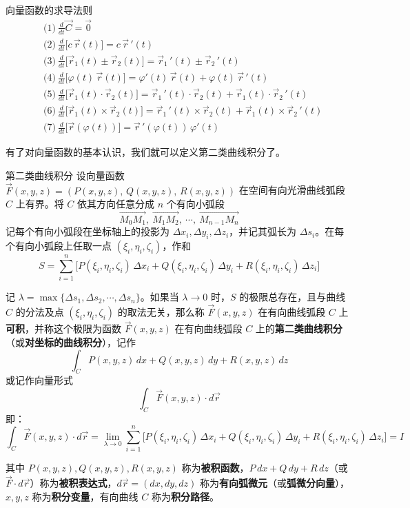 \begin{theorem}{向量函数的求导法则}{}
\[
\begin{aligned}
&\text{(1)}\ \frac{d}{dt}\vec{C} = \vec{0} \\[4pt]
&\text{(2)}\ \frac{d}{dt}\big[c\,\vec{r}(t)\big] = c\,\vec{r}\,'(t) \\[4pt]
&\text{(3)}\ \frac{d}{dt}\big[\vec{r}_1(t) \pm \vec{r}_2(t)\big] = \vec{r}_1\,'(t) \pm \vec{r}_2\,'(t) \\[4pt]
&\text{(4)}\ \frac{d}{dt}\big[\varphi(t)\,\vec{r}(t)\big] = \varphi'(t)\,\vec{r}(t) + \varphi(t)\,\vec{r}\,'(t) \\[4pt]
&\text{(5)}\ \frac{d}{dt}\big[\vec{r}_1(t) \cdot \vec{r}_2(t)\big] = \vec{r}_1\,'(t) \cdot \vec{r}_2(t) + \vec{r}_1(t) \cdot \vec{r}_2\,'(t) \\[4pt]
&\text{(6)}\ \frac{d}{dt}\big[\vec{r}_1(t) \times \vec{r}_2(t)\big] = \vec{r}_1\,'(t) \times \vec{r}_2(t) + \vec{r}_1(t) \times \vec{r}_2\,'(t) \\[4pt]
&\text{(7)}\ \frac{d}{dt}\big[\vec{r}(\varphi(t))\big] = \vec{r}\,'(\varphi(t))\,\varphi'(t)
\end{aligned}
\]
\end{theorem}

有了对向量函数的基本认识，我们就可以定义第二类曲线积分了。

\begin{definition}{第二类曲线积分}{}
设向量函数 \(\vec{F}(x,y,z) = (P(x,y,z),\,Q(x,y,z),\,R(x,y,z))\) 在空间有向光滑曲线弧段 \(C\) 上有界。将 \(C\) 依其方向任意分成 \(n\) 个有向小弧段
\[
\overrightarrow{M_{0}M_{1}},\ \overrightarrow{M_{1}M_{2}},\ \cdots,\ \overrightarrow{M_{n-1}M_{n}}
\]
记每个有向小弧段在坐标轴上的投影为 \(\Delta x_i, \Delta y_i, \Delta z_i\)，并记其弧长为 \(\Delta s_i\)。在每个有向小弧段上任取一点 \((\xi_i,\eta_i,\zeta_i)\)，作和
\[
S = \sum_{i=1}^{n} \bigl[ P(\xi_i,\eta_i,\zeta_i)\,\Delta x_i + Q(\xi_i,\eta_i,\zeta_i)\,\Delta y_i + R(\xi_i,\eta_i,\zeta_i)\,\Delta z_i \bigr]
\]

记 \(\lambda = \max\{\Delta s_1,\Delta s_2,\cdots,\Delta s_n\}\)。如果当 \(\lambda \to 0\) 时，\(S\) 的极限总存在，且与曲线 \(C\) 的分法及点 \((\xi_i,\eta_i,\zeta_i)\) 的取法无关，那么称 \(\vec{F}(x,y,z)\) 在有向曲线弧段 \(C\) 上\textbf{可积}，并称这个极限为函数 \(\vec{F}(x,y,z)\) 在有向曲线弧段 \(C\) 上的\textbf{第二类曲线积分}（或\textbf{对坐标的曲线积分}），记作
\[
\int_{C} P(x,y,z)\,dx + Q(x,y,z)\,dy + R(x,y,z)\,dz
\]
或记作向量形式
\[
\int_{C} \vec{F}(x,y,z) \cdot d\vec{r}
\]
即：
\[
\int_{C} \vec{F}(x,y,z) \cdot d\vec{r} = \lim_{\lambda \to 0} \sum_{i=1}^{n} \bigl[ P(\xi_i,\eta_i,\zeta_i)\,\Delta x_i + Q(\xi_i,\eta_i,\zeta_i)\,\Delta y_i + R(\xi_i,\eta_i,\zeta_i)\,\Delta z_i \bigr] = I
\]

其中 \(P(x,y,z), Q(x,y,z), R(x,y,z)\) 称为\textbf{被积函数}，\(P\,dx + Q\,dy + R\,dz\)（或 \(\vec{F} \cdot d\vec{r}\)）称为\textbf{被积表达式}，\(d\vec{r} = (dx, dy, dz)\) 称为\textbf{有向弧微元}（或\textbf{弧微分向量}），\(x,y,z\) 称为\textbf{积分变量}，有向曲线 \(C\) 称为\textbf{积分路径}。
\end{definition}


